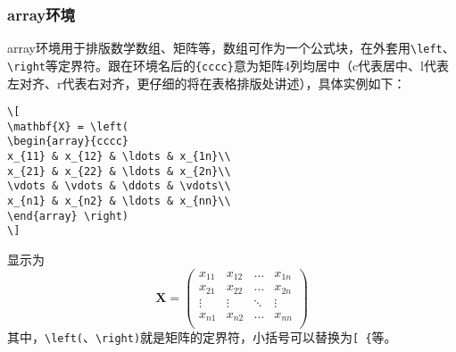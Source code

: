 \subsubsection{array环境}
array环境用于排版数学数组、矩阵等，数组可作为一个公式块，在外套用\verb|\left|、\verb|\right|等定界符。跟在环境名后的\verb|{cccc}|意为矩阵4列均居中（c代表居中、l代表左对齐、r代表右对齐，更仔细的将在表格排版处讲述），具体实例如下：
\begin{verbatim}
\[ 
\mathbf{X} = \left(
\begin{array}{cccc}
x_{11} & x_{12} & \ldots & x_{1n}\\
x_{21} & x_{22} & \ldots & x_{2n}\\
\vdots & \vdots & \ddots & \vdots\\
x_{n1} & x_{n2} & \ldots & x_{nn}\\
\end{array} \right) 
\]
\end{verbatim}
显示为
\[ 
\mathbf{X} = \left(
\begin{array}{cccc}
x_{11} & x_{12} & \ldots & x_{1n}\\
x_{21} & x_{22} & \ldots & x_{2n}\\
\vdots & \vdots & \ddots & \vdots\\
x_{n1} & x_{n2} & \ldots & x_{nn}\\
\end{array} \right) 
\]
其中，\verb|\left(|、\verb|\right)|就是矩阵的定界符，小括号可以替换为\verb|[ {|等。

